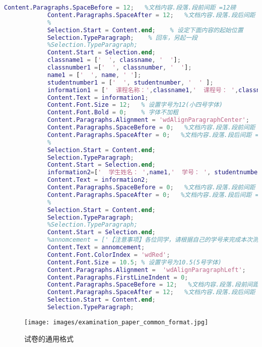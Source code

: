 \begin{lstlisting}[language=Matlab]
            Content.Paragraphs.SpaceBefore = 12;   %文档内容.段落.段前间距 =12磅
            Content.Paragraphs.SpaceAfter = 12;   %文档内容.段落.段后间距 =12磅
            %
            Selection.Start = Content.end;    % 设定下面内容的起始位置
            Selection.TypeParagraph;    % 回车，另起一段
            %Selection.TypeParagraph;
            Content.Start = Selection.end;
            classname1 = ['  ', classname, '  '];
            classnumber1 =['  ', classnumber, '  '];
            name1 = ['  ', name, ' '];
            studentnumber1 = ['  ', studentnumber, '  ' ];
            information1 = ['  课程名称：',classname1,'  课程号： ',classnumber1];
            Content.Text = information1;
            Content.Font.Size = 12;   % 设置字号为12(小四号字体)
            Content.Font.Bold = 0;    % 字体不加粗
            Content.Paragraphs.Alignment = 'wdAlignParagraphCenter';    % 居中对齐
            Content.Paragraphs.SpaceBefore = 0;   %文档内容.段落.段前间距 =0磅
            Content.Paragraphs.SpaceAfter = 0;   %文档内容.段落.段后间距 =0磅
            %
            Selection.Start = Content.end;
            Selection.TypeParagraph;
            Content.Start = Selection.end;
            information2=['  学生姓名： ',name1,'  学号： ', studentnumber1];
            Content.Text = information2;
            Content.Paragraphs.SpaceBefore = 0;   %文档内容.段落.段前间距 =0磅
            Content.Paragraphs.SpaceAfter = 0;   %文档内容.段落.段后间距 =0磅
            %
            Selection.Start = Content.end;
            Selection.TypeParagraph;
            %Selection.TypeParagraph;
            Content.Start = Selection.end;
            %annomcement = ['【注意事项】各位同学，请根据自己的学号来完成本次测试题(见以学号命名的压缩包中，包括试卷、数据和答案表)，将答案(数值题保留四位小数、非数值题见各大题要求)填写在EXCEL工作薄中相应的单元格中，并在规定的时间内提交以自己学号命名的EXCEL工作薄。在计算相关的统计量及其P值时均不采用连续性修正！'];
            Content.Text = annomcement;
            Content.Font.ColorIndex = 'wdRed';
            Content.Font.Size = 10.5; % 设置字号为10.5(5号字体)
            Content.Paragraphs.Alignment =  'wdAlignParagraphLeft';
            Content.Paragraphs.FirstLineIndent = 0;
            Content.Paragraphs.SpaceBefore = 12;   %文档内容.段落.段前间距 =12磅
            Content.Paragraphs.SpaceAfter = 12;   %文档内容.段落.段后间距 =12磅
            Selection.Start = Content.end;
            Selection.TypeParagraph;
            \end{lstlisting}
            \begin{figure}[H]
            \centering
            \texttt{[image: images/examination\_paper\_common\_format.jpg]}
            \caption{试卷的通用格式}
            \label{fig:试卷的通用格式}
            \end{figure}
